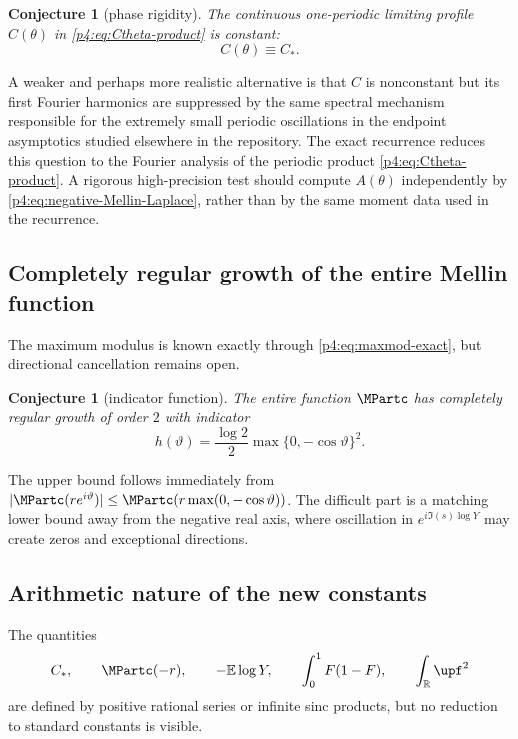 \documentclass[11pt,oneside]{article}
\newtheorem{conjecture}[theorem]{Conjecture}
\theoremstyle{definition}
\theoremstyle{remark}
\newcommand{\F}{F}
\newcommand{\E}{\mathbb E}
\newcommand{\R}{\mathbb R}
\newcommand{\1}{\mathbf 1}
\begin{document}
\begin{conjecture}[phase rigidity]\label{p4:conj:phase-constant}
The continuous one-periodic limiting profile \(C(\theta)\) in
\cref{p4:eq:Ctheta-product} is constant:
\begin{equation}\label{p4:eq:Ctheta-conjecture}
 C(\theta)\equiv C_*.
\end{equation}
\end{conjecture}

A weaker and perhaps more realistic alternative is that \(C\) is nonconstant but its
first Fourier harmonics are suppressed by the same spectral mechanism responsible for
the extremely small periodic oscillations in the endpoint asymptotics studied elsewhere
in the repository.  The exact recurrence reduces this question to the Fourier analysis
of the periodic product \cref{p4:eq:Ctheta-product}.  A rigorous high-precision
test should compute \(A(\theta)\) independently by \cref{p4:eq:negative-Mellin-Laplace},
rather than by the same moment data used in the recurrence.

\subsection{Completely regular growth of the entire Mellin function}

The maximum modulus is known exactly through \cref{p4:eq:maxmod-exact}, but directional
cancellation remains open.

\begin{conjecture}[indicator function]\label{p4:conj:indicator}
The entire function \(\MPartc\) has completely regular growth of order \(2\) with indicator
\begin{equation}\label{p4:eq:indicator-conjecture}
 h(\vartheta)=\frac{\log2}{2}
 \max\{0,-\cos\vartheta\}^2.
\end{equation}
\end{conjecture}

The upper bound follows immediately from
\(|\MPartc(re^{i\vartheta})|\le\MPartc(r\max(0,-\cos\vartheta))\).  The difficult part is a
matching lower bound away from the negative real axis, where oscillation in
\(e^{i\Im(s)\log Y}\) may create zeros and exceptional directions.

\subsection{Arithmetic nature of the new constants}

The quantities
\begin{equation}\label{p4:eq:new-constants}
 C_*,\qquad \MPartc(-r),\qquad -\E\log Y,
 \qquad \int_0^1\F(1-\F),\qquad \int_\R\upf^2
\end{equation}
are defined by positive rational series or infinite sinc products, but no reduction to
standard constants is visible.
\end{document}
